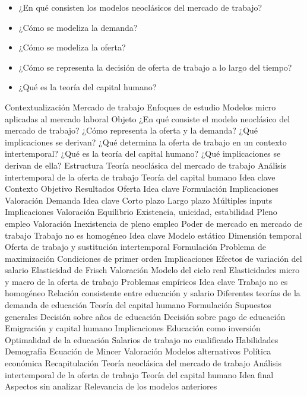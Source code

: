 \documentclass{nuevotema}
\begin{document}
\ideaclave

\begin{itemize}
	\item ¿En qué consisten los modelos neoclásicos del mercado de trabajo?
	\item ¿Cómo se modeliza la demanda?
	\item ¿Cómo se modeliza la oferta?
	\item ¿Cómo se representa la decisión de oferta de trabajo a lo largo del tiempo?
	\item ¿Qué es la teoría del capital humano?
\end{itemize}

\esquemacorto

\begin{esquema}[enumerate]
	\1[] 
		\2 Contextualización
			\3 Mercado de trabajo
			\3 Enfoques de estudio
			\3 Modelos micro aplicadas al mercado laboral
		\2 Objeto
			\3 ¿En qué consiste el modelo neoclásico del mercado de trabajo?
			\3 ¿Cómo representa la oferta y la demanda?
			\3 ¿Qué implicaciones se derivan?
			\3 ¿Qué determina la oferta de trabajo en un contexto intertemporal?
			\3 ¿Qué es la teoría del capital humano?
			\3 ¿Qué implicaciones se derivan de ella?
		\2 Estructura
			\3 Teoría neoclásica del mercado de trabajo
			\3 Análisis intertemporal de la oferta de trabajo
			\3 Teoría del capital humano
	\1 
		\2 Idea clave
			\3 Contexto
			\3 Objetivo
			\3 Resultados
		\2 Oferta
			\3 Idea clave
			\3 Formulación
			\3 Implicaciones
			\3 Valoración
		\2 Demanda
			\3 Idea clave
			\3 Corto plazo
			\3 Largo plazo
			\3 Múltiples inputs
			\3 Implicaciones
			\3 Valoración
		\2 Equilibrio
			\3 Existencia, unicidad, estabilidad
			\3 Pleno empleo
		\2 Valoración
			\3 Inexistencia de pleno empleo
			\3 Poder de mercado en mercado de trabajo
			\3 Trabajo no es homogéneo
	\1 
		\2 Idea clave
			\3 Modelo estático
			\3 Dimensión temporal
			\3 Oferta de trabajo y sustitución intertemporal
		\2 Formulación
			\3 Problema de maximización
			\3 Condiciones de primer orden
		\2 Implicaciones
			\3 Efectos de variación del salario
			\3 Elasticidad de Frisch
		\2 Valoración
			\3 Modelo del ciclo real
			\3 Elasticidades micro y macro de la oferta de trabajo
			\3 Problemas empíricos
	\1 
		\2 Idea clave
			\3 Trabajo no es homogéneo
			\3 Relación consistente entre educación y salario
			\3 Diferentes teorías de la demanda de educación
			\3 Teoría del capital humano
		\2 Formulación
			\3 Supuestos generales
			\3 Decisión sobre años de educación
			\3 Decisión sobre pago de educación
			\3 Emigración y capital humano
		\2 Implicaciones
			\3 Educación como inversión
			\3 Optimalidad de la educación
			\3 Salarios de trabajo no cualificado
			\3 Habilidades
			\3 Demografía
			\3 Ecuación de Mincer
		\2 Valoración
			\3 Modelos alternativos
			\3 Política económica
	\1 
		\2 Recapitulación
			\3 Teoría neoclásica del mercado de trabajo
			\3 Análisis intertemporal de la oferta de trabajo
			\3 Teoría del capital humano
		\2 Idea final
			\3 Aspectos sin analizar
			\3 Relevancia de los modelos anteriores


\end{esquema}
\end{document}
